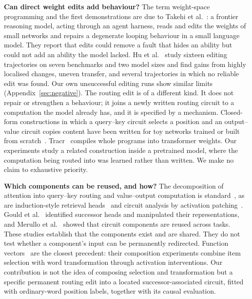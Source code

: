 \documentclass[11pt]{article}
\begin{document}
\textbf{Can direct weight edits add behaviour?} The term weight-space programming and the first demonstrations are due to Takehi et al.~\cite{sparks}: a frontier reasoning model, acting through an agent harness, reads and edits the weights of small networks and repairs a degenerate looping behaviour in a small language model. They report that edits could remove a fault that hides an ability but could not add an ability the model lacked. Hu et al.~\cite{hu2026wsp} study sixteen editing trajectories on seven benchmarks and two model sizes and find gains from highly localised changes, uneven transfer, and several trajectories in which no reliable edit was found. Our own unsuccessful editing runs show similar limits (Appendix~\ref{sec:negative}). The routing edit is of a different kind. It does not repair or strengthen a behaviour; it joins a newly written routing circuit to a computation the model already has, and it is specified by a mechanism. Closed-form constructions in which a query--key circuit selects a position and an output--value circuit copies content have been written for toy networks trained or built from scratch~\cite{wspscratch,lindner2023tracr}. Tracr~\cite{lindner2023tracr} compiles whole programs into transformer weights. Our experiments study a related construction inside a pretrained model, where the computation being routed into was learned rather than written. We make no claim to exhaustive priority.

\textbf{Which components can be reused, and how?} The decomposition of attention into query--key routing and value--output computation is standard~\cite{elhage2021framework}, as are induction-style retrieval heads~\cite{olsson2022induction} and circuit analysis by activation patching~\cite{wang2023ioi}. Gould et al.~\cite{gould2023successor} identified successor heads and manipulated their representations, and Merullo et al.~\cite{merullo2024reuse} showed that circuit components are reused across tasks. These studies establish that the components exist and are shared. They do not test whether a component's input can be permanently redirected. Function vectors~\cite{todd2024function} are the closest precedent: their composition experiments combine item selection with word transformation through activation interventions. Our contribution is not the idea of composing selection and transformation but a specific permanent routing edit into a located successor-associated circuit, fitted with ordinary-word position labels, together with its causal evaluation.
\end{document}
